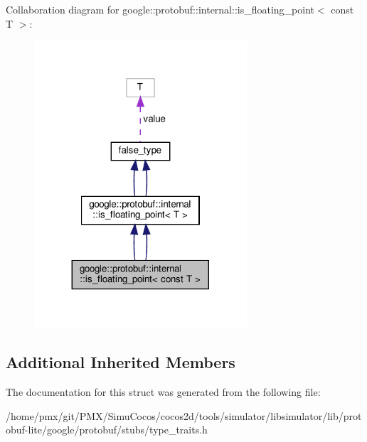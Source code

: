 Collaboration diagram for google\+:\+:protobuf\+:\+:internal\+:\+:is\+\_\+floating\+\_\+point$<$ const T $>$\+:
\nopagebreak
\begin{figure}[H]
\begin{center}
\leavevmode
\includegraphics[width=224pt]{structgoogle_1_1protobuf_1_1internal_1_1is__floating__point_3_01const_01T_01_4__coll__graph}
\end{center}
\end{figure}
\subsection*{Additional Inherited Members}


The documentation for this struct was generated from the following file\+:\begin{DoxyCompactItemize}
\item 
/home/pmx/git/\+P\+M\+X/\+Simu\+Cocos/cocos2d/tools/simulator/libsimulator/lib/protobuf-\/lite/google/protobuf/stubs/type\+\_\+traits.\+h\end{DoxyCompactItemize}
